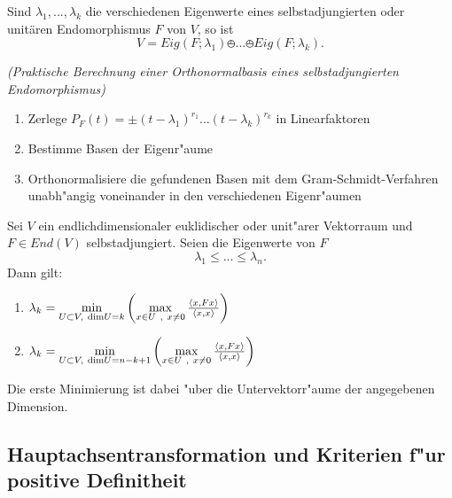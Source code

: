 \documentclass[11pt, a4paper]{article}
\begin{document}
\begin{corollary}
Sind \(\lambda_{1}, ..., \lambda_{k}\) die verschiedenen Eigenwerte eines selbstadjungierten oder unitären Endomorphismus \(F\) von \(V\), so ist
$$
V= Eig (F ; \lambda_{1}) \obot ... \obot Eig(F ; \lambda_{k}).
$$
\end{corollary}

\begin{remark} \textit{(Praktische Berechnung einer Orthonormalbasis eines selbstadjungierten Endomorphismus)}
\begin{enumerate}
\item Zerlege $P_F(t) = \pm (t- \lambda_1)^{r_1} ... (t- \lambda_k)^{r_k} $ in Linearfaktoren
\item Bestimme Basen der Eigenr"aume
\item Orthonormalisiere die gefundenen Basen mit dem Gram-Schmidt-Verfahren unabh"angig voneinander in den verschiedenen Eigenr"aumen
\end{enumerate}

\end{remark}

\begin{theorem} Sei $V$ ein endlichdimensionaler euklidischer oder unit"arer Vektorraum und $F \in End(V)$ selbstadjungiert. Seien die Eigenwerte von $F$ 
$$
\lambda_1 \leq ... \leq \lambda_n.
$$
Dann gilt:
\begin{enumerate}
\item $\lambda_k = \min\limits_{U\subset V,\ \mathrm{dim} U = k} \left(   \max\limits_{x\in U\ , \ x \neq 0} \frac{\scp{x}{Fx}}{\scp{x}{x}}\right)$
\item $\lambda_k = \min\limits_{U\subset V,\ \mathrm{dim} U = n - k + 1} \left(   \max\limits_{x\in U\ , \ x \neq 0} \frac{\scp{x}{Fx}}{\scp{x}{x}}\right)$
\end{enumerate}
Die erste Minimierung ist dabei "uber die Untervektorr"aume der angegebenen Dimension.
\end{theorem}
 
\subsection{Hauptachsentransformation und Kriterien f"ur positive Definitheit}
\end{document}

